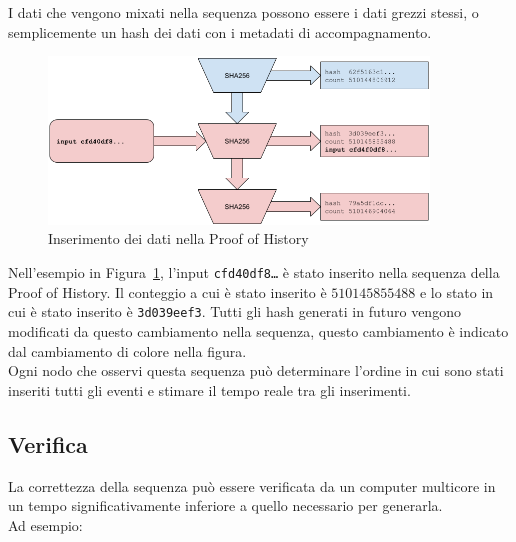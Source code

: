 \documentclass[12pt]{article}
\begin{document}
I dati che vengono mixati nella sequenza possono essere i dati grezzi stessi, o semplicemente un hash dei dati con i metadati di accompagnamento.\\

\begin{figure}[h]
  \begin{center}
    \centering
    \includegraphics[width=0.9\textwidth]{figures/fig_3.png}
    \caption[Fig 3]{Inserimento dei dati nella Proof of History\label{fig:poh_insert}}
  \end{center}
  \end{figure}

  Nell'esempio in Figura~\ref{fig:poh_insert}, l'input \texttt{cfd40df8\ldots} è stato inserito nella sequenza della Proof of History. Il conteggio a cui è stato inserito è $510145855488$ e lo stato in cui è stato inserito è \texttt{3d039eef3}. Tutti gli hash generati in futuro vengono modificati da questo cambiamento nella sequenza, questo cambiamento è indicato dal cambiamento di colore nella figura.\\

Ogni nodo che osservi questa sequenza può determinare l'ordine in cui sono stati inseriti tutti gli eventi e stimare il tempo reale tra gli inserimenti.

\subsection{Verifica}\label{poh:verify}
La correttezza della sequenza può essere verificata da un computer multicore in un tempo significativamente inferiore a quello necessario per generarla.\\

\noindent Ad esempio: \\\noindent
\end{document}
